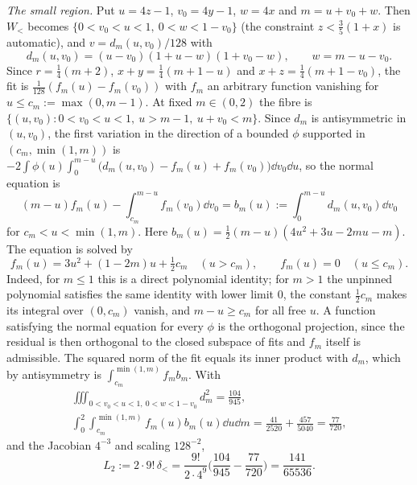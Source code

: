\documentclass[11pt,colorlinks]{charlie}
\begin{document}
\emph{The small region.} Put $u=4z-1$, $v_0=4y-1$, $w=4x$ and $m=u+v_0+w$. Then $W_<$ becomes $\{0<v_0<u<1,\ 0<w<1-v_0\}$ (the constraint $z<\frac35(1+x)$ is automatic), and $v=d_m(u,v_0)/128$ with
\[
 d_m(u,v_0)=(u-v_0)(1+u-w)(1+v_0-w),\qquad w=m-u-v_0 .
\]
Since $r=\frac14(m+2)$, $x+y=\frac14(m+1-u)$ and $x+z=\frac14(m+1-v_0)$, the fit is $\frac1{128}(f_m(u)-f_m(v_0))$ with $f_m$ an arbitrary function vanishing for $u\le c_m:=\max(0,m-1)$. At fixed $m\in(0,2)$ the fibre is $\{(u,v_0):0<v_0<u<1,\ u>m-1,\ u+v_0<m\}$. Since $d_m$ is antisymmetric in $(u,v_0)$, the first variation in the direction of a bounded $\phi$ supported in $(c_m,\min(1,m))$ is $-2\int\phi(u)\int_0^{m-u}\big(d_m(u,v_0)-f_m(u)+f_m(v_0)\big)\dd v_0\dd u$, so the normal equation is
\begin{equation}\label{eq:normal}
 (m-u)f_m(u)-\int_{c_m}^{m-u}f_m(v_0)\dd v_0=b_m(u):=\int_0^{m-u}d_m(u,v_0)\dd v_0
\end{equation}
for $c_m<u<\min(1,m)$. Here $b_m(u)=\frac12(m-u)(4u^2+3u-2mu-m)$. The equation is solved by
\begin{equation}\label{eq:fm}
 f_m(u)=3u^2+(1-2m)u+\tfrac12c_m\quad(u>c_m),\qquad f_m(u)=0\quad(u\le c_m).
\end{equation}
Indeed, for $m\le1$ this is a direct polynomial identity; for $m>1$ the unpinned polynomial satisfies the same identity with lower limit $0$, the constant $\frac12c_m$ makes its integral over $(0,c_m)$ vanish, and $m-u\ge c_m$ for all free $u$. A function satisfying the normal equation for every $\phi$ is the orthogonal projection, since the residual is then orthogonal to the closed subspace of fits and $f_m$ itself is admissible. The squared norm of the fit equals its inner product with $d_m$, which by antisymmetry is $\int_{c_m}^{\min(1,m)}f_mb_m$. With
\begin{gather*}
 \iiint_{0<v_0<u<1,\ 0<w<1-v_0}d_m^2=\frac{104}{945},\\
 \int_0^2\int_{c_m}^{\min(1,m)}f_m(u)b_m(u)\dd u\dd m=\frac{41}{2520}+\frac{457}{5040}=\frac{77}{720},
\end{gather*}
and the Jacobian $4^{-3}$ and scaling $128^{-2}$,
\begin{equation}\label{eq:L2}
 L_2:=2\cdot9!\,\delta_<=\frac{9!}{2\cdot4^9}\Big(\frac{104}{945}-\frac{77}{720}\Big)=\frac{141}{65536}.
\end{equation}
\end{document}
